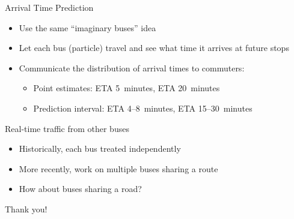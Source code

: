 \documentclass[10pt,t]{beamer}
\begin{document}
\begin{frame}{Arrival Time Prediction}
  \begin{itemize}[<+->]
  \item Use the same ``imaginary buses'' idea

  \item Let each bus (particle) travel and see what time it arrives at future stops

  \item Communicate the distribution of arrival times to commuters:
    \begin{itemize}
    \item Point estimates: ETA 5~minutes, ETA 20~minutes
    \item Prediction interval: ETA 4--8~minutes, ETA 15--30~minutes
    \end{itemize}
  \end{itemize}
\end{frame}

\begin{frame}{Real-time traffic from other buses}
  \begin{itemize}[<+->]
  \item Historically, each bus treated independently
  \item More recently, work on multiple buses sharing a route
  \item How about buses sharing a road?
  \end{itemize}
\end{frame}


\begin{frame}[standout]
  Thank you!
\end{frame}
\end{document}
